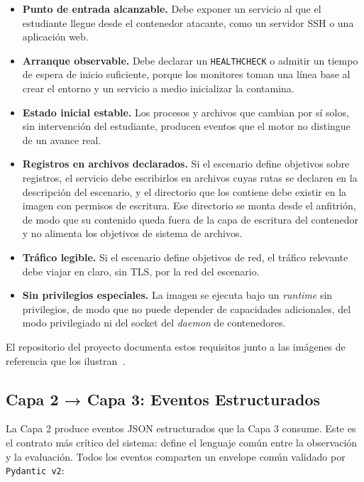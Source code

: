 \begin{itemize}
    \item \textbf{Punto de entrada alcanzable.} Debe exponer un servicio al que
    el estudiante llegue desde el contenedor atacante, como un servidor SSH o
    una aplicación web.

    \item \textbf{Arranque observable.} Debe declarar un \texttt{HEALTHCHECK} o
    admitir un tiempo de espera de inicio suficiente, porque los monitores
    toman una línea base al crear el entorno y un servicio a medio inicializar
    la contamina.

    \item \textbf{Estado inicial estable.} Los procesos y archivos que cambian
    por sí solos, sin intervención del estudiante, producen eventos que el
    motor no distingue de un avance real.

    \item \textbf{Registros en archivos declarados.} Si el escenario define
    objetivos sobre registros, el servicio debe escribirlos en archivos cuyas
    rutas se declaren en la descripción del escenario, y el directorio que los
    contiene debe existir en la imagen con permisos de escritura. Ese
    directorio se monta desde el anfitrión, de modo que su contenido queda
    fuera de la capa de escritura del contenedor y no alimenta los objetivos de
    sistema de archivos.

    \item \textbf{Tráfico legible.} Si el escenario define objetivos de red, el
    tráfico relevante debe viajar en claro, sin TLS, por la red del escenario.

    \item \textbf{Sin privilegios especiales.} La imagen se ejecuta bajo un
    \textit{runtime} sin privilegios, de modo que no puede depender de
    capacidades adicionales, del modo privilegiado ni del socket del
    \textit{daemon} de contenedores.
\end{itemize}

El repositorio del proyecto documenta estos requisitos junto a las imágenes de
referencia que los ilustran~\cite{flexipwn}.

\subsection{Capa 2 → Capa 3: Eventos Estructurados}

La Capa 2 produce eventos JSON estructurados que la Capa 3 consume. Este es el
contrato más crítico del sistema: define el lenguaje común entre la observación
y la evaluación. Todos los eventos comparten un envelope común validado por
\texttt{Pydantic v2}:

